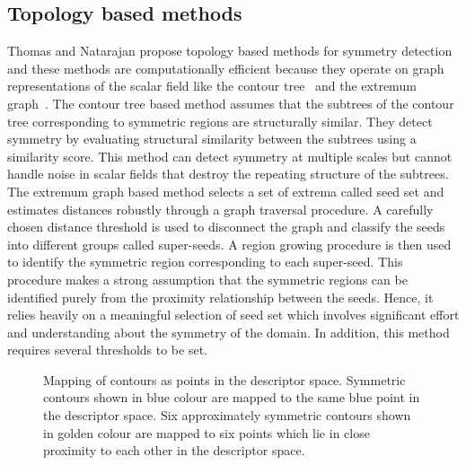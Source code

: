 \documentclass[review,journal]{vgtc}         %
\begin{document}
\subsection{Topology based methods}
Thomas and Natarajan propose topology based methods for symmetry detection and these methods 
are computationally efficient because they operate on graph representations of the scalar field
like the contour tree~\cite{ThomN11} and the extremum graph~\cite{ThomN13}. The contour tree based method 
assumes that the subtrees of the contour tree corresponding to symmetric regions are structurally
similar. They detect symmetry by evaluating structural similarity between the subtrees using a 
similarity score. This method can detect symmetry at multiple scales but cannot handle
noise in scalar fields that destroy the repeating structure of the subtrees. The extremum 
graph based method selects a set of extrema called seed set and 
estimates distances robustly through a graph traversal procedure. A carefully chosen distance 
threshold is used to disconnect the graph and classify the seeds into different groups called 
super-seeds. A region growing procedure is then used to identify the symmetric region 
corresponding to each super-seed. This procedure makes a strong assumption that the symmetric regions
can be identified purely from the proximity relationship between the seeds. Hence,
it relies heavily on a meaningful selection of seed set which involves significant effort 
and understanding about the symmetry of the domain. In addition, this method requires several thresholds
to be set.
\begin{figure}[b]
\centering
{
	\caption{\label{ctmap}Mapping of contours as points in the descriptor space. Symmetric contours
		shown in blue colour are mapped to the same blue point in the descriptor space. Six approximately
		symmetric contours shown in golden colour are mapped to six points which lie in close
		proximity to each other in the descriptor space.}
}
\end{figure}
\end{document}
